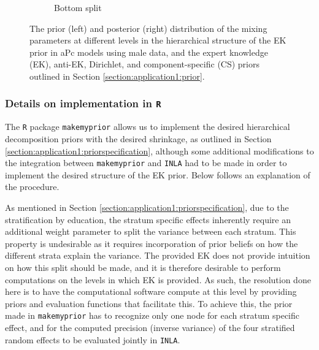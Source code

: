 \begin{figure}[h]
\begin{subfigure}[b]{0.8\textwidth}
        \caption[]%
        {{\small  Bottom split}}    
        \label{figure:Application1:s3_m}
    \end{subfigure}
    \vspace{-0.2cm}
    \caption{The prior (left) and posterior (right) distribution of the mixing parameters at different levels in the hierarchical structure of the EK prior in aPc models using male data, and the expert knowledge (EK), anti-EK, Dirichlet, and component-specific (CS) priors outlined in Section \ref{section:application1:prior}. }
    \label{figure:Application1:compare-plots_m}

\end{figure}

\FloatBarrier
\subsubsection{Details on implementation in \texttt{R}}
\label{appendix:implementation:prior}
The \texttt{R} package \texttt{makemyprior} allows us to implement the desired hierarchical decomposition priors with the desired shrinkage, as outlined in Section \ref{section:application1:priorspecification}, although some additional modifications to the integration between \texttt{makemyprior} and \texttt{INLA} had to be made in order to implement the desired structure of the EK prior. Below follows an explanation of the procedure.

As mentioned in Section \ref{section:application1:priorspecification}, due to the stratification by education, the stratum specific effects inherently require an additional weight parameter to split the variance between each stratum. This property is undesirable as it requires incorporation of prior beliefs on how the different strata explain the variance. The provided EK does not provide intuition on how this split should be made, and it is therefore desirable to perform computations on the levels in which EK is provided. As such, the resolution done here is to have the computational software compute at this level by providing priors and evaluation functions that facilitate this. To achieve this, the prior made in \texttt{makemyprior} has to recognize only one node for each stratum specific effect, and for the computed precision (inverse variance) of the four stratified random effects to be evaluated jointly in \texttt{INLA}. 

